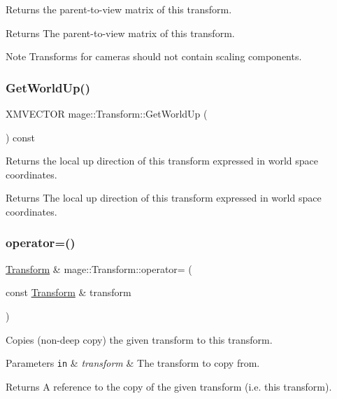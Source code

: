 Returns the parent-\/to-\/view matrix of this transform.

\begin{DoxyReturn}{Returns}
The parent-\/to-\/view matrix of this transform. 
\end{DoxyReturn}
\begin{DoxyNote}{Note}
Transforms for cameras should not contain scaling components. 
\end{DoxyNote}
\hypertarget{structmage_1_1_transform_af28786b745a144eef74d69a55055b00a}{}\label{structmage_1_1_transform_af28786b745a144eef74d69a55055b00a} 
\subsubsection{\texorpdfstring{Get\+World\+Up()}{GetWorldUp()}}
{\footnotesize\ttfamily X\+M\+V\+E\+C\+T\+OR mage\+::\+Transform\+::\+Get\+World\+Up (\begin{DoxyParamCaption}{ }\end{DoxyParamCaption}) const}

Returns the local up direction of this transform expressed in world space coordinates.

\begin{DoxyReturn}{Returns}
The local up direction of this transform expressed in world space coordinates. 
\end{DoxyReturn}
\hypertarget{structmage_1_1_transform_aec91179a63ea0c9af1023a38b60f197c}{}\label{structmage_1_1_transform_aec91179a63ea0c9af1023a38b60f197c} 
\subsubsection{\texorpdfstring{operator=()}{operator=()}}
{\footnotesize\ttfamily \hyperlink{structmage_1_1_transform}{Transform} \& mage\+::\+Transform\+::operator= (\begin{DoxyParamCaption}\item[{const \hyperlink{structmage_1_1_transform}{Transform} \&}]{transform }\end{DoxyParamCaption})}

Copies (non-\/deep copy) the given transform to this transform.


\begin{DoxyParams}[1]{Parameters}
\mbox{\tt in}  & {\em transform} & The transform to copy from. \\
\hline
\end{DoxyParams}
\begin{DoxyReturn}{Returns}
A reference to the copy of the given transform (i.\+e. this transform). 
\end{DoxyReturn}
\hypertarget{structmage_1_1_transform_a1f9e00affb4b41338a6a946867a1d5a4}{}\label{structmage_1_1_transform_a1f9e00affb4b41338a6a946867a1d5a4} 
